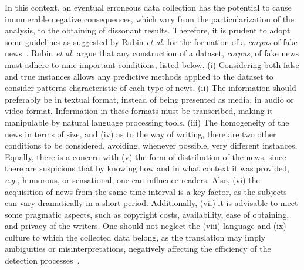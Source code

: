 \documentclass{ieeeaccess}
\begin{document}
In this context, an eventual erroneous data collection has the potential to cause innumerable negative consequences, which vary from the particularization of the analysis, to the obtaining of dissonant results. Therefore, it is prudent to adopt some guidelines as suggested by Rubin \textit{et al.} for the formation of a \textit{corpus} of fake news~\cite{rubin2015deception}. Rubin {\it et al.} argue that any construction of a dataset, \textit{corpus}, of fake news must adhere to nine important conditions, listed below. (i) Considering both false and true instances allows any predictive methods applied to the dataset to consider patterns characteristic of each type of news. (ii) The information should preferably be in textual format, instead of being presented as media, in audio or video format. Information in these formats must be transcribed, making it manipulable by natural language processing tools. (iii) The homogeneity of the news in terms of size, and (iv) as to the way of writing, there are two other conditions to be considered, avoiding, whenever possible, very different instances. Equally, there is a concern with (v) the form of distribution of the news, since there are suspicions that by knowing how and in what context it was provided, \textit{e.g.}, humorous, or sensational, one can influence readers. Also, (vi) the acquisition of news from the same time interval is a key factor, as the subjects can vary dramatically in a short period. Additionally, (vii) it is advisable to meet some pragmatic aspects, such as copyright costs, availability, ease of obtaining, and privacy of the writers. One should not neglect the (viii) language and (ix) culture to which the collected data belong, as the translation may imply ambiguities or misinterpretations, negatively affecting the efficiency of the detection processes~\cite{rubin2015deception, rubin2014pragmatic}.
\end{document}
